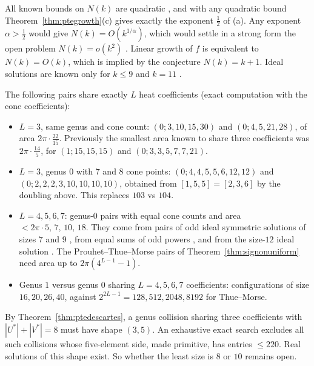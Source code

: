 \begin{remark}\label{rem:pteexponent}
All known bounds on $N(k)$ are quadratic \cite[Prop.~3 and p.~7]{borweiningalls1994}, and with any
quadratic bound Theorem~\ref{thm:ptegrowth}(c) gives exactly the exponent $\tfrac12$ of (a). Any exponent $\alpha>\tfrac12$ would give
$N(k)=O(k^{1/\alpha})$, which would settle in a strong form the open problem
$N(k)=o(k^2)$ \cite[\S6, Q3]{borweiningalls1994}. Linear growth of $f$ is equivalent to
$N(k)=O(k)$, which is implied by the conjecture $N(k)=k+1$. Ideal solutions are known only for
$k\le9$ and $k=11$ \cite{cmsv2024,crootmaoyip2026}.
\end{remark}

\begin{example}\label{ex:ptepairs}
The following pairs share exactly $L$ heat coefficients (exact computation with the cone
coefficients):
\begin{itemize}
\item $L=3$, same genus and cone count: $(0;3,10,15,30)$ and $(0;4,5,21,28)$, of area
  $2\pi\cdot\frac{22}{15}$. Previously the smallest area known to share three coefficients was
  $2\pi\cdot\frac{14}5$, for $(1;15,15,15)$ and $(0;3,3,5,7,7,21)$.
\item $L=3$, genus $0$ with $7$ and $8$ cone points: $(0;4,4,5,5,6,12,12)$ and
  $(0;2,2,2,3,10,10,10,10)$, obtained from $[1,5,5]=[2,3,6]$ \cite{chen2025survey} by the doubling
  above. This replaces $103$ vs $104$.
\item $L=4,5,6,7$: genus-$0$ pairs with equal cone counts and area
  $<2\pi\cdot5,\,7,\,10,\,18$. They come from pairs of odd ideal symmetric solutions of sizes $7$
  and $9$ \cite{borweiningalls1994,blp2003}, from equal sums of odd powers
  \cite{chen2025survey}, and from the size-$12$ ideal solution \cite{cmsv2024}. The
  Prouhet--Thue--Morse pairs of Theorem~\ref{thm:signonuniform} need area up to
  $2\pi(4^{L-1}-1)$.
\item Genus $1$ versus genus $0$ sharing $L=4,5,6,7$ coefficients: configurations of size
  $16,20,26,40$, against $2^{2L-1}=128,512,2048,8192$ for Thue--Morse.
\end{itemize}
\end{example}

\begin{remark}\label{rem:ptet3}
By Theorem~\ref{thm:ptedescartes}, a genus collision sharing three coefficients with
$|U^*|+|V^*|=8$ must have shape $(3,5)$. An exhaustive exact search excludes all such collisions
whose five-element side, made primitive, has entries $\le220$. Real solutions of this shape
exist. So whether the least size is $8$ or $10$ remains open.
\end{remark}


